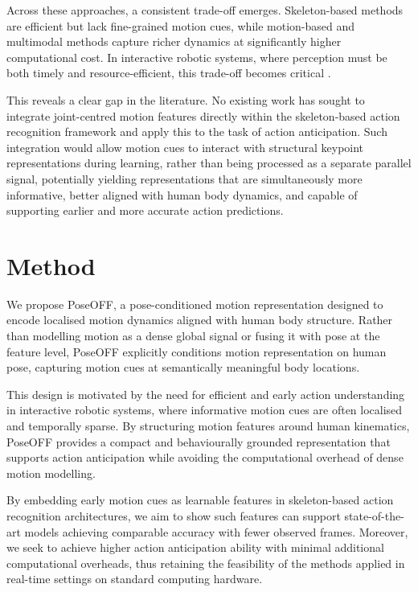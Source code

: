\documentclass[letterpaper, 10 pt, conference]{ieeeconf}
\begin{document}
Across these approaches, a consistent trade-off emerges. Skeleton-based methods are efficient but lack fine-grained motion cues, while motion-based and multimodal methods capture richer dynamics at significantly higher computational cost. In interactive robotic systems, where perception must be both timely and resource-efficient, this trade-off becomes critical \cite{dragan2013Legibilitypredictabilityrobotmotion,villani2018SurveyhumanrobotcollaborationindustrialsettingsSafetyintuitiveinterfacesapplications}.

This reveals a clear gap in the literature. No existing work has sought to integrate joint-centred motion features directly within the skeleton-based action recognition framework and apply this to the task of action anticipation. Such integration would allow motion cues to interact with structural keypoint representations during learning, rather than being processed as a separate parallel signal, potentially yielding representations that are simultaneously more informative, better aligned with human body dynamics, and capable of supporting earlier and more accurate action predictions.

\section{Method}
\label{sec:method}

We propose PoseOFF, a pose-conditioned motion representation designed to encode localised motion dynamics aligned with human body structure. Rather than modelling motion as a dense global signal or fusing it with pose at the feature level, PoseOFF explicitly conditions motion representation on human pose, capturing motion cues at semantically meaningful body locations.

This design is motivated by the need for efficient and early action understanding in interactive robotic systems, where informative motion cues are often localised and temporally sparse. By structuring motion features around human kinematics, PoseOFF provides a compact and behaviourally grounded representation that supports action anticipation while avoiding the computational overhead of dense motion modelling.

By embedding early motion cues as learnable features in skeleton-based action recognition architectures, we aim to show such features can support state-of-the-art models achieving comparable accuracy with fewer observed frames.
Moreover, we seek to achieve higher action anticipation ability with minimal additional computational overheads, thus retaining the feasibility of the methods applied in real-time settings on standard computing hardware.
\end{document}
